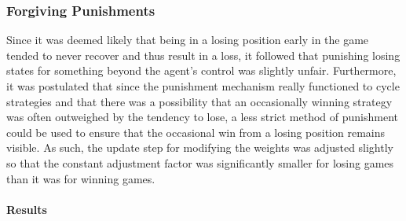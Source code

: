 
\subsubsection{Forgiving Punishments}
\label{sec:findings-expts-punishments}

Since it was deemed likely that being in a losing position early in the game
tended to never recover and thus result in a loss,
it followed that punishing losing states for something beyond the agent's
control was slightly unfair.
%
Furthermore,
it was postulated that since the punishment mechanism really functioned to cycle
strategies
and that there was a possibility that an occasionally winning strategy was often
outweighed by the tendency to lose,
a less strict method of punishment could be used to ensure that the occasional
win from a losing position remains visible.
%
As such,
the update step for modifying the weights was adjusted slightly
so that the constant adjustment factor was significantly smaller for losing
games than it was for winning games.

\paragraph{Results}

